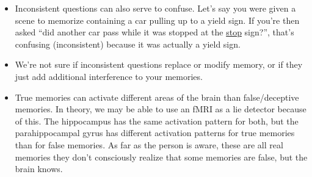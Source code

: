 \documentclass[]{article}
\begin{document}
\begin{itemize}
\begin{itemize}
					\end{itemize}
				\item Inconsistent questions can also serve to confuse. Let's say you were given a scene to memorize containing a car pulling up to a yield sign. If you're then asked ``did another car pass while it was stopped at the \underline{stop} sign?'', that's confusing (inconsistent) because it was actually a yield sign.
				\item We're not sure if inconsistent questions replace or modify memory, or if they just add additional interference to your memories.
				\item True memories can activate different areas of the brain than false/deceptive memories. In theory, we may be able to use an fMRI as a lie detector because of this. The hippocampus has the same activation pattern for both, but the parahippocampal gyrus has different activation patterns for true memories than for false memories. As far as the person is aware, these are all real memories \textendash{} they don't consciously realize that some memories are false, but the brain knows.
			\end{itemize}
\end{document}

